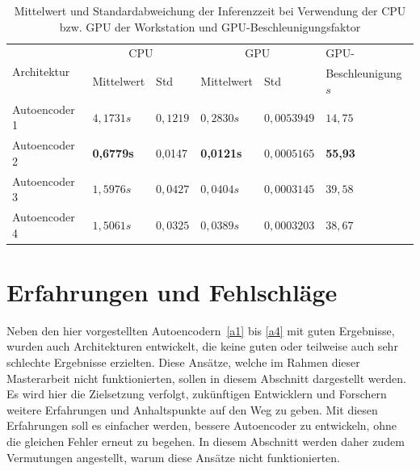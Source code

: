 \begin{table}[htbp]
    \centering
    \caption{Mittelwert und Standardabweichung der Inferenzzeit bei Verwendung der CPU bzw. GPU der Workstation und GPU-Beschleunigungsfaktor}
    \label{tab:exp5results}
    \smallskip
    \begin{tabular}{ llllll }
        \toprule
        \multirow{2}{*}{Architektur} & \multicolumn{2}{c}{CPU} & \multicolumn{2}{c}{GPU} & GPU- \\
        \cline{2-5}
        & Mittelwert & Std & Mittelwert & Std & Beschleunigung $s$ \\
        \hline
        Autoencoder 1 & $4,1731s$ & $0,1219$ & $0,2830s$ & $0,0053949$ & $14,75$\\
        Autoencoder 2 & \textbf{0,6779s} & 0,0147 & \textbf{0,0121s} & $0,0005165$ & \textbf{55,93}\\
        Autoencoder 3 & $1,5976s$ & $0,0427$ & $0,0404s$ & $0,0003145$ & $39,58$\\
        Autoencoder 4 & $1,5061s$ & $0,0325$ & $0,0389s$ & $0,0003203$ & $38,67$\\
        \bottomrule
    \end{tabular}
\end{table}

\section{Erfahrungen und Fehlschläge}
Neben den hier vorgestellten Autoencodern~\ref{a1} bis \ref{a4} mit guten Ergebnisse, wurden auch Architekturen entwickelt, die keine guten oder teilweise auch sehr schlechte Ergebnisse erzielten. Diese Ansätze, welche im Rahmen dieser Masterarbeit nicht funktionierten, sollen in diesem Abschnitt dargestellt werden. Es wird hier die Zielsetzung verfolgt, zukünftigen Entwicklern und Forschern weitere Erfahrungen und Anhaltspunkte auf den Weg zu geben. Mit diesen Erfahrungen soll es einfacher werden, bessere Autoencoder zu entwickeln, ohne die gleichen Fehler erneut zu begehen. In diesem Abschnitt werden daher zudem Vermutungen angestellt, warum diese Ansätze nicht funktionierten.

